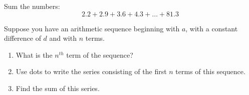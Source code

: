 \begin{prob}
Sum the numbers:
\[
2.2 + 2.9 + 3.6 + 4.3 + \dots + 81.3
\]
\end{prob}


\begin{prob}
Suppose you have an arithmetic sequence beginning with $a$, with a constant difference of $d$ and with $n$ terms.  
\begin{enumerate}
\item What is the $n^{th}$ term of the sequence?  
\item Use dots to write the series consisting of the first $n$ terms of this sequence.
\item Find the sum of this series.  
\end{enumerate}
\end{prob}


